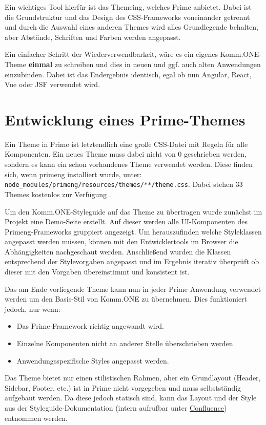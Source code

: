 Ein wichtiges Tool hierfür ist das Themeing, welches Prime anbietet. Dabei ist die Grundstruktur und das Design des CSS-Frameworks voneinander getrennt und durch die Auswahl eines anderen Themes wird alles Grundlegende behalten, aber Abstände, Schriften und Farben werden angepasst. 

Ein einfacher Schritt der Wiederverwendbarkeit, wäre es ein eigenes Komm.ONE-Theme \textbf{einmal} zu schreiben und dies in neuen und ggf. auch alten Anwendungen einzubinden. Dabei ist das Endergebnis identisch, egal ob nun Angular, React, Vue oder JSF verwendet wird.

\chapter{Entwicklung eines Prime-Themes}

Ein Theme in Prime ist letztendlich eine große CSS-Datei mit Regeln für alle Komponenten. Ein neues Theme muss dabei nicht von $0$ geschrieben werden, sondern es kann ein schon vorhandenes Theme verwendet werden. Diese finden sich, wenn primeng installiert wurde, unter: \lstinline|node_modules/primeng/resources/themes/**/theme.css|. Dabei stehen 33 Themes kostenlos zur Verfügung \cite{Primeng.20.01.2023}. 

Um den Komm.ONE-Styleguide auf das Theme zu übertragen wurde zunächst im Projekt eine Demo-Seite erstellt. Auf dieser werden alle UI-Komponenten des Primeng-Frameworks gruppiert angezeigt. Um herauszufinden welche Styleklassen angepasst werden müssen, können mit den Entwicklertools im Browser die Abhängigkeiten nachgeschaut werden. Anschließend wurden die Klassen entsprechend der Stylevorgaben angepasst und im Ergebnis iterativ überprüft ob dieser mit den Vorgaben übereinstimmt und konsistent ist. 

Das am Ende vorliegende Theme kann nun in jeder Prime Anwendung verwendet werden um den Basis-Stil von Komm.ONE zu übernehmen. Dies funktioniert jedoch, nur wenn:
\begin{itemize}
    \setlength\itemsep{-1em}
    \item Das Prime-Framework richtig angewandt wird.
    \item Einzelne Komponenten nicht an anderer Stelle überschrieben werden
    \item Anwendungsspezifische Styles angepasst werden. 
\end{itemize}

Das Theme bietet nur einen stilistischen Rahmen, aber ein Grundlayout (Header, Sidebar, Footer, etc.) ist in Prime nicht vorgegeben und muss selbstständig aufgebaut werden. Da diese jedoch statisch sind, kann das Layout und der Style aus der Styleguide-Dokumentation (intern aufrufbar unter \href{https://confluence.komm-one.net/display/GWR/Styleguide+1.0.1-alpha}{Confluence}) entnommen werden.

